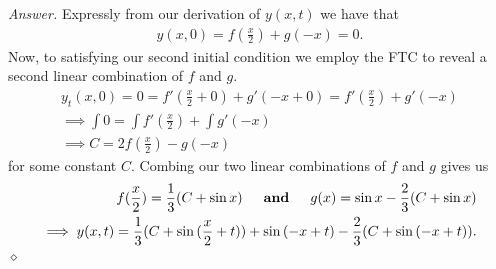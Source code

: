 \documentclass[12pt,oneside]{amsart}
\theoremstyle{definition}
\theoremstyle{remark}
\numberwithin{equation}{exer}
\newenvironment{answer}{\bigskip\noindent\emph{Answer.}}{\hfill$\diamond$\newline}
\begin{document}
\begin{answer}
Expressly from our derivation of $y(x,t)$ we have that 
\begin{align*}
    y(x,0) = f(\frac{x}{2}) + g(-x) = 0.
\end{align*}
Now, to satisfying our second initial condition we employ the FTC to reveal a second linear combination of $f$ and $g$. 
\begin{align*}
    y_t(x,0) = 0 = f'(\frac{x}{2} + 0) + g'(-x + 0) = f'(\frac{x}{2}) + g'(-x)\\
    \implies \int 0 = \int f'(\frac{x}{2}) + \int g'(-x)\\
    \implies C = 2f(\frac{x}{2}) - g(-x)
\end{align*}
for some constant $C$. Combing our two linear combinations of $f$ and $g$ gives us 
\begin{align*}
    f(\frac{x}{2}) =\frac{1}{3}(C + \sin{x}) \indent \textbf{and} \indent
    g(x) = \sin{x} -\frac{2}{3}(C + \sin{x})\\
    \implies y(x,t) = \frac{1}{3}(C + \sin{(\frac{x}{2} + t})) + \sin{(-x + t)} -\frac{2}{3}(C + \sin{(-x + t)}).
\end{align*}
\end{answer}
\end{document}
